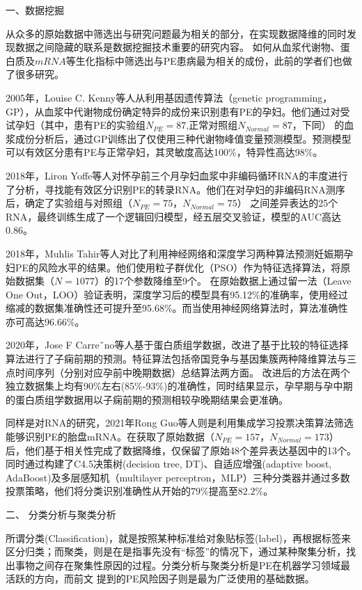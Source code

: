 一、数据挖掘

从众多的原始数据中筛选出与研究问题最为相关的部分，在实现数据降维的同时发现数据之间隐藏的联系是数据挖掘技术重要的研究内容。
如何从血浆代谢物、蛋白质及$mRNA$等生化指标中筛选出与PE患病最为相关的成份，此前的学者们也做了很多研究。

2005年，Louise C. Kenny等人\cite{Kenny2005}从利用基因遗传算法（genetic programming，GP），从血浆中代谢物成份确定特异的成份来识别患有PE的孕妇。他们通过对受试孕妇（其中，患有PE的实验组$N_{PE}=87$,正常对照组$N_{Normal}=87$，下同）
的血浆成份分析后，通过GP训练出了仅使用三种代谢物峰值变量预测模型。预测模型可以有效区分患有PE与正常孕妇，其灵敏度高达100\%，特异性高达98\%。

2018年，Liron Yoffe等人\cite{Yoffe2018}对怀孕前三个月孕妇血浆中非编码循环RNA的丰度进行了分析，寻找能有效区分识别PE的转录RNA。他们在对孕妇的非编码RNA测序后，确定了实验组与对照组（$N_{PE}=75$，$N_{Normal}=75$）
之间差异表达的25个RNA，最终训练生成了一个逻辑回归模型，经五层交叉验证，模型的AUC高达0.86。

2018年，Muhlis Tahir等人\cite{Tahir2018,Tahir2018-2}对比了利用神经网络和深度学习两种算法预测妊娠期孕妇PE的风险水平的结果。他们使用粒子群优化（PSO）作为特征选择算法，将原始数据集（$N=1077$）的17个参数降维至9个。
在原始数据上通过留一法（Leave One Out，LOO）验证表明，深度学习后的模型具有95.12\%的准确率，使用经过缩减的数据集准确性还可提升至95.68\%。而当使用神经网络算法时，算法准确性亦可高达96.66\%。

2020年，Jose F Carre˜no等人\cite{Carreno2020}基于蛋白质组学数据，改进了基于比较的特征选择算法进行了子痫前期的预测。特征算法包括帝国竞争与基因集簇两种降维算法与三点时间序列（分别对应孕前中晚期数据）总结算法两方面。
改进后的方法在两个独立数据集上均有90\%左右(85\%-93\%)的准确性，同时结果显示，孕早期与孕中期的蛋白质组学数据用以子痫前期的预测相较孕晚期结果会更准确。

同样是对RNA的研究，2021年Rong Guo等人\cite{Guo2021}则是利用集成学习投票决策算法筛选能够识别PE的胎盘mRNA。在获取了原始数据（$N_{PE}=157$，$N_{Normal}=173$）后，他们基于相关性完成了数据降维，仅保留了原始48个差异表达基因中的13个。
同时通过构建了C4.5决策树(decision tree, DT)、自适应增强(adaptive boost, AdaBoost)及多层感知机（multilayer perceptron，MLP）三种分类器并通过多数投票策略，他们将分类识别准确性从开始的$79\%$提高至$82.2\%$。

二、 分类分析与聚类分析

所谓分类(Classification)，就是按照某种标准给对象贴标签(label)，再根据标签来区分归类；而聚类，则是在是指事先没有“标签”的情况下，通过某种聚集分析，找出事物之间存在聚集性原因的过程。分类分析与聚类分析是PE在机器学习领域最活跃的方向，而前文
提到的PE风险因子则是最为广泛使用的基础数据。

